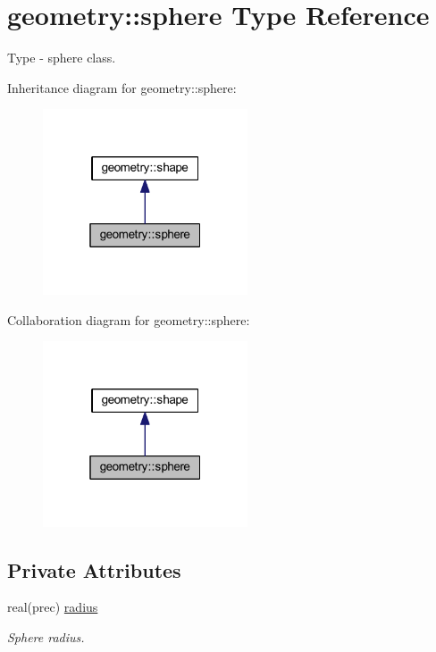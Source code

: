 \hypertarget{structgeometry_1_1sphere}{}\section{geometry\+:\+:sphere Type Reference}
\label{structgeometry_1_1sphere}


Type -\/ sphere class.  




Inheritance diagram for geometry\+:\+:sphere\+:\nopagebreak
\begin{figure}[H]
\begin{center}
\leavevmode
\includegraphics[width=172pt]{structgeometry_1_1sphere__inherit__graph}
\end{center}
\end{figure}


Collaboration diagram for geometry\+:\+:sphere\+:\nopagebreak
\begin{figure}[H]
\begin{center}
\leavevmode
\includegraphics[width=172pt]{structgeometry_1_1sphere__coll__graph}
\end{center}
\end{figure}
\subsection*{Private Attributes}
\begin{DoxyCompactItemize}
\item 
real(prec) \hyperlink{structgeometry_1_1sphere_a906fbbdb8c6b56e7d45cea4e96b6e04d}{radius}
\begin{DoxyCompactList}\small\item\em Sphere radius. \end{DoxyCompactList}\end{DoxyCompactItemize}


